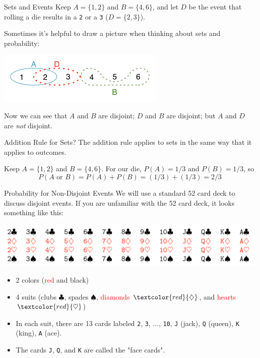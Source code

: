 \begin{frame}{Sets and Events}
    Keep $A=\{1,2\}$ and $B=\{4,6\}$, and let $D$ be the event that rolling a die results in a \texttt{2} or a \texttt{3} ($D=\{2,3\}$).
    
    \vspace{12pt}Sometimes it's helpful to draw a picture when thinking about sets and probability:
    \begin{center}
        \includegraphics[scale=0.75]{images/sets.png}
    \end{center}
    Now we can see that $A$ and $B$ are disjoint; $D$ and $B$ are disjoint; but $A$ and $D$ are \textit{not} disjoint.
\end{frame}

\begin{frame}{Addition Rule for Sets?}
    The addition rule applies to sets in the same way that it applies to outcomes.
    
    \vspace{12pt}Keep $A=\{1,2\}$ and $B=\{4,6\}$. For our die, $P(A)=1/3$ and $P(B)=1/3$, so 
    \[
        P(A \text{ or } B)=P(A)+P(B)=(1/3)+(1/3)=2/3
    \]
\end{frame}

\begin{frame}{Probability for Non-Disjoint Events}
    We will use a standard 52 card deck to discuss disjoint events. If you are unfamiliar with the 52 card deck, it looks something like this:
    \begin{center}
        \includegraphics[scale=0.5]{images/cards.png}
    \end{center}
    \begin{itemize}
        \item 2 colors (\textcolor{red}{red} and black)
        \item 4 suits (clubs $\clubsuit$, spades $\spadesuit$, \textcolor{red}{diamonds} $\textcolor{red}{\diamondsuit}$, and \textcolor{red}{hearts} $\textcolor{red}{\heartsuit}$)
        \item In each suit, there are 13 cards labeled \texttt{2}, \texttt{3}, ..., \texttt{10}, \texttt{J} (jack), \texttt{Q} (queen), \texttt{K} (king), \texttt{A} (ace).
        \item The cards \texttt{J}, \texttt{Q}, and \texttt{K} are called the "face cards".
    \end{itemize}
\end{frame}

